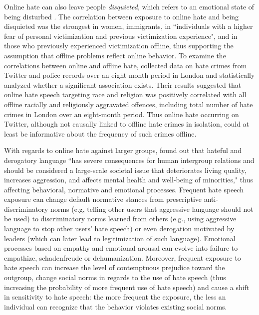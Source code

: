 \documentclass[a4paper,fleqn]{cas-dc}
\begin{document}
Online hate can also leave people \textit{disquieted}, which refers to an emotional state of being disturbed \citep{savimaki2020disquieted}. The correlation between exposure to online hate and being disquieted was the strongest 
in women, immigrants, 
in ``individuals with a higher fear of personal victimization and previous victimization experience", and in those who previously experienced victimization offline, thus supporting the assumption that offline problems reflect online behavior. 
To
examine the correlations between online and offline hate, \citet{williams2020hate} collected data on hate crimes from Twitter and police records over an eight-month period in London and statistically analyzed whether
a significant association exists. Their results suggested that online hate speech targeting race and religion was positively correlated with all offline racially and religiously aggravated offences, including total number of hate crimes in London over an eight-month period. Thus online hate occurring on Twitter, although not causally linked to offline hate crimes in isolation, could at least be informative about the frequency of such crimes offline.

With regards to online hate against larger groups, 
\citet{bilewicz2020hate} found out that hateful and derogatory language ``has severe consequences for human intergroup relations and should be considered a large-scale societal issue that deteriorates living quality, increases aggression, and affects mental health and well-being of minorities," thus affecting behavioral, normative and emotional processes.  Frequent hate speech exposure can change default normative stances from prescriptive anti-discriminatory norms (e.g, telling other users that aggressive language should not be used) to  discriminatory norms learned from others  (e.g., using aggressive language to stop other users' hate speech) or even derogation motivated by leaders (which can later lead to legitimization of such language). Emotional processes based on empathy and emotional arousal can evolve into failure to empathize, schadenfreude or dehumanization. 
Moreover, frequent exposure to hate speech can increase the level of contemptuous prejudice toward the outgroup, change social norms in regards to the use of hate speech (thus increasing the probability of more frequent use of hate speech) and cause a shift in sensitivity to hate speech: the more frequent the exposure, the less an individual can recognize that the behavior violates existing social norms.
\end{document}
